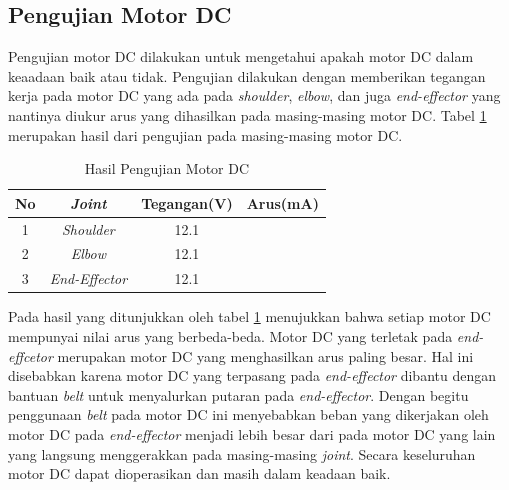 \subsection{Pengujian Motor DC}
Pengujian motor DC dilakukan untuk mengetahui apakah motor DC dalam keaadaan baik atau tidak. Pengujian dilakukan dengan memberikan tegangan kerja pada motor DC yang ada pada \textit{shoulder}, \textit{elbow}, dan juga \textit{end-effector} yang nantinya diukur arus yang dihasilkan pada masing-masing motor DC. Tabel \ref{tbl.motordc} merupakan hasil dari pengujian pada masing-masing motor DC.

\begin{table}[h]
		\centering
	\caption{Hasil Pengujian Motor DC}
	\label{tbl.motordc}
	\begin{tabular}{|c|c|c|c|}
		\hline
		\rowcolor[HTML]{9B9B9B} 
		No & \textit{Joint}        & Tegangan(V) & Arus(mA) \\ \hline
		1  & \textit{Shoulder}     & 12.1        &          \\ \hline
		2  & \textit{Elbow}        & 12.1        &          \\ \hline
		3  & \textit{End-Effector} & 12.1        &          \\ \hline
	\end{tabular}
\end{table}

Pada hasil yang ditunjukkan oleh tabel \ref{tbl.motordc} menujukkan bahwa setiap motor DC mempunyai nilai arus yang berbeda-beda. Motor DC yang terletak pada \textit{end-effcetor} merupakan motor DC yang menghasilkan arus paling besar. Hal ini disebabkan karena motor DC yang terpasang pada \textit{end-effector} dibantu dengan bantuan \textit{belt} untuk menyalurkan putaran pada\textit{ end-effector}. Dengan begitu penggunaan \textit{belt} pada motor DC ini menyebabkan beban yang dikerjakan oleh motor DC pada \textit{end-effector} menjadi lebih besar dari pada motor DC yang lain yang langsung menggerakkan pada masing-masing \textit{joint}. Secara keseluruhan motor DC dapat dioperasikan dan masih dalam keadaan baik.

